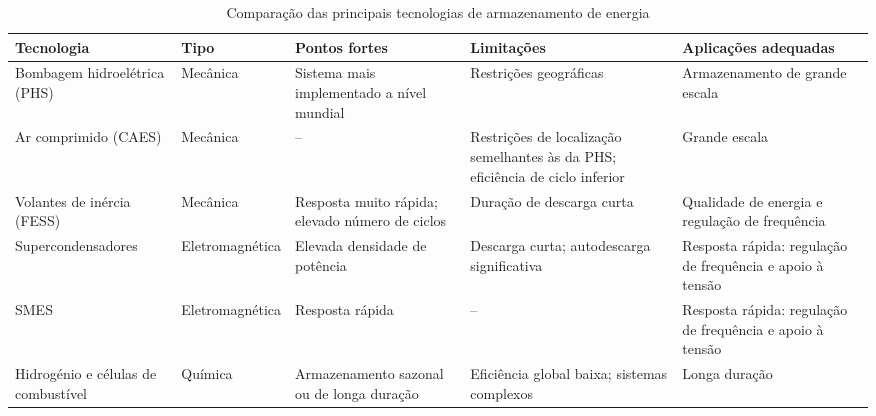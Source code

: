 \begin{table}[htbp]
    \centering
    \caption{Comparação das principais tecnologias de armazenamento de energia}
    \label{tab:comparacao_tecnologias_armazenamento}

    \footnotesize
    \renewcommand{\arraystretch}{1.3}
    \setlength{\tabcolsep}{3pt}
    \sloppy
    
    \begin{tabularx}{\textwidth}{
        |>{\centering\arraybackslash}p{2.1cm}
        |>{\centering\arraybackslash}p{1.8cm}
        |>{\centering\arraybackslash}X
        |>{\centering\arraybackslash}X
        |>{\centering\arraybackslash}X|}
        
        \hline
        \textbf{Tecnologia} &
        \textbf{Tipo} &
        \textbf{Pontos fortes} &
        \textbf{Limitações} &
        \textbf{Aplicações adequadas} \\
        \hline

        Bombagem hidroelétrica (PHS) &
        Mecânica &
        Sistema mais implementado a nível mundial &
        Restrições geográficas &
        Armazenamento de grande escala \\
        \hline

        Ar comprimido (CAES) &
        Mecânica &
        -- &
        Restrições de localização semelhantes às da PHS; eficiência de ciclo inferior &
        Grande escala \\
        \hline

        Volantes de inércia (FESS) &
        Mecânica &
        Resposta muito rápida; elevado número de ciclos &
        Duração de descarga curta &
        Qualidade de energia e regulação de frequência \\
        \hline

        Supercon\-densadores &
        Eletromag\-nética &
        Elevada densidade de potência &
        Descarga curta; autodescarga significativa &
        Resposta rápida: regulação de frequência e apoio à tensão \\
        \hline

        SMES &
        Eletromag\-nética &
        Resposta rápida &
        -- &
        Resposta rápida: regulação de frequência e apoio à tensão \\
        \hline

        Hidrogénio e células de combustível &
        Química &
        Armazenamento sazonal ou de longa duração &
        Eficiência global baixa; sistemas complexos &
        Longa duração \\
        \hline


\end{tabularx}
\end{table}
